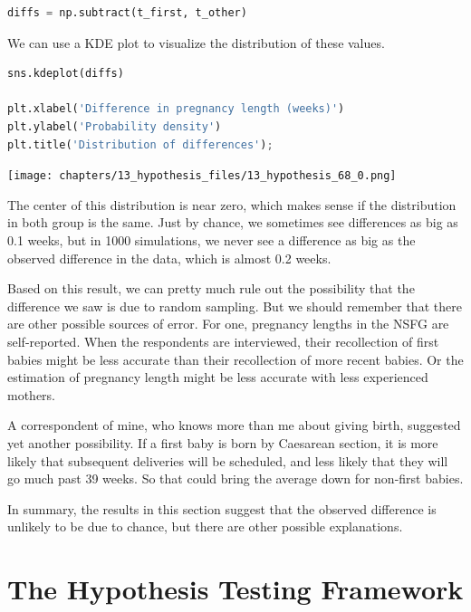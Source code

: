 \begin{lstlisting}[language=Python,style=source]
diffs = np.subtract(t_first, t_other)
\end{lstlisting}

We can use a KDE plot to visualize the distribution of these values.

\begin{lstlisting}[language=Python,style=source]
sns.kdeplot(diffs)

plt.xlabel('Difference in pregnancy length (weeks)')
plt.ylabel('Probability density')
plt.title('Distribution of differences');
\end{lstlisting}

\begin{center}
\texttt{[image: chapters/13\_hypothesis\_files/13\_hypothesis\_68\_0.png]}
\end{center}

The center of this distribution is near zero, which makes sense if the
distribution in both group is the same. Just by chance, we sometimes see
differences as big as 0.1 weeks, but in 1000 simulations, we never see a
difference as big as the observed difference in the data, which is
almost 0.2 weeks.

Based on this result, we can pretty much rule out the possibility that
the difference we saw is due to random sampling. But we should remember
that there are other possible sources of error. For one, pregnancy
lengths in the NSFG are self-reported. When the respondents are
interviewed, their recollection of first babies might be less accurate
than their recollection of more recent babies. Or the estimation of
pregnancy length might be less accurate with less experienced mothers.

A correspondent of mine, who knows more than me about giving birth,
suggested yet another possibility. If a first baby is born by Caesarean
section, it is more likely that subsequent deliveries will be scheduled,
and less likely that they will go much past 39 weeks. So that could
bring the average down for non-first babies.

In summary, the results in this section suggest that the observed
difference is unlikely to be due to chance, but there are other possible
explanations.

\section{The Hypothesis Testing
Framework}\label{the-hypothesis-testing-framework}

